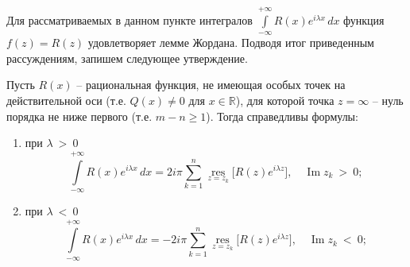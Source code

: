 Для рассматриваемых в данном пункте интегралов $\textstyle{\int\limits_{-\infty}^{+\infty} R(x)e^{i\lambda x}\,dx}$ функция $f(z)=R(z)$ удовлетворяет лемме Жордана. Подводя итог приведенным рассуждениям, запишем следующее утверждение.
\begin{assertion}
Пусть $R(x)$ -- рациональная функция, не имеющая особых точек на действительной оси (т.е. $Q(x)\ne0$ для $x\in\mathbb{R}$), для которой точка $z=\infty$ -- нуль порядка не ниже первого (т.е. $m-n\geqslant1$). Тогда справедливы формулы:
\begin{enumerate}
\item при $\lambda\: >\: 0$
$$
\int\limits_{-\infty}^{+\infty} R(x)e^{i\lambda x}\,dx= 2i\pi \sum_{k=1}^{n} \mathop{\operatorname{res}}\limits_{z=z_k} \bigl[R(z)e^{i\lambda z}\bigr],\quad \operatorname{Im} z_k\: >\: 0;
$$
\item при $\lambda\: <\: 0$
$$
\int\limits_{-\infty}^{+\infty} R(x)e^{i\lambda x}\,dx=-2i\pi\sum_{k=1}^{n} \mathop{\operatorname{res}}\limits_{z=z_k} \bigl[R(z)e^{i\lambda z}\bigr],\quad \operatorname{Im} z_k\: <\: 0;
$$
\end{enumerate}
\end{assertion}

\clearpage
